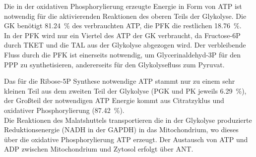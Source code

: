 Die in der oxidativen Phosphorylierung erzeugte Energie in Form von ATP ist notwendig für die aktivierenden Reaktionen des oberen Teils der Glykolyse.  Die GK benötigt 81.24~\% des verbrauchten ATP, die PFK die restlichen 18.76~\%.\\
In der PFK wird nur ein Viertel des ATP der GK verbraucht, da Fructose-6P durch TKET und die TAL aus der Glykolyse abgezogen wird. Der verbleibende Fluss durch die PFK ist einerseits notwendig, um Glycerinaldehyd-3P für den PPP zu synthetisieren, andererseits für den Glykolysefluss zum Pyruvat.

Das für die Ribose-5P Synthese notwendige ATP stammt nur zu einem sehr kleinen Teil aus dem zweiten Teil der Glykolyse (PGK und PK jeweils 6.29~\%), der Großteil der notwendigen ATP Energie kommt aus Citratzyklus und oxidativer Phosphorylierung (87.42~\%).\\
Die Reaktionen des Malatshuttels transportieren die in der Glykolyse produzierte Reduktionsenergie (NADH in der GAPDH) in das Mitochondrium, wo dieses über die oxidative Phosphorylierung ATP erzeugt. Der Austausch von ATP und ADP zwischen Mitochondrium und Zytosol erfolgt über ANT. 


